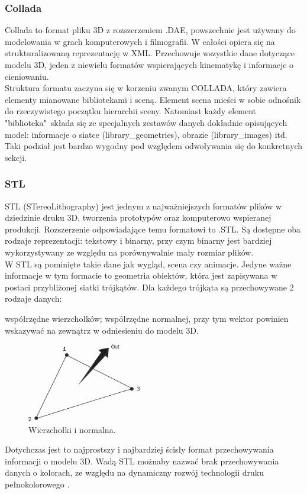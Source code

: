 \subsubsection{Collada}
Collada to format pliku 3D z rozszerzeniem .DAE, powszechnie jest używany do modelowania w grach komputerowych i filmografii. W całości opiera się na strukturalizowaną reprezentację w XML. Przechowuje wszystkie dane dotyczące modelu 3D, jeden z niewielu formatów wspierających kinematykę i informacje o cieniowaniu.\\
Struktura formatu zaczyna się w korzeniu zwanym COLLADA, który zawiera elementy mianowane bibliotekami i sceną. Element scena mieści w sobie odnośnik do rzeczywistego początku hierarchii sceny. Natomiast każdy element "biblioteka"\ składa się ze specjalnych zestawów danych dokładnie opisujących model: informacje o siatce (library\_geometries), obrazie (library\_images) itd. Taki podział jest bardzo wygodny pod względem odwoływania się do konkretnych sekcji.  

\subsubsection{STL}
STL (STereoLithography) jest jednym z najważniejszych formatów plików w dziedzinie druku 3D, tworzenia prototypów oraz komputerowo wspieranej produkcji. Rozszerzenie odpowiadające temu formatowi to .STL. Są dostępne oba rodzaje reprezentacji: tekstowy i binarny, przy czym binarny jest bardziej wykorzystywany ze względu na porównywalnie mały rozmiar plików. \\
W STL są pominięte takie dane jak wygląd, scena czy animacje. Jedyne ważne informacje w tym formacie to geometria obiektów, która jest zapisywana w postaci przybliżonej siatki trójkątów. Dla każdego trójkąta są przechowywane 2 rodzaje danych:
\begin{itemize}
\itemi współrzędne wierzchołków;
\itemi współrzędne normalnej, przy tym wektor powinien wskazywać na zewnątrz w odniesieniu do modelu 3D.
\end{itemize}
\begin{figure}[H]
		\centering
 		\includegraphics[width=5.0cm]{vertices-and-normal.png}
    	\caption{Wierzchołki i normalna.}
 		\label{rys6}
\end{figure}
 Dotychczas jest to najprostszy i najbardziej ścisły format przechowywania informacji o modelu 3D. Wadą STL możnaby nazwać brak przechowywania danych o kolorach, ze względu na dynamiczny rozwój technologii druku pełnokolorowego \cite{stlinfo}.

